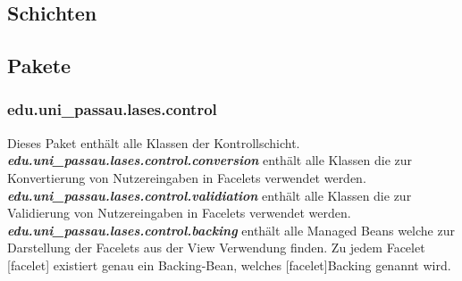 
\subsection{Schichten}\label{arch:schichten}

\subsection{Pakete}\label{arch:pakete}

\subsubsection{edu.uni\_passau.lases.control} \label{arch:control}
Dieses Paket enthält alle Klassen der Kontrollschicht.
\newline\newline
\textbf{\emph{edu.uni\_passau.lases.control.conversion}}
enthält alle Klassen die zur Konvertierung von Nutzereingaben
in Facelets verwendet werden.
\newline\newline
\textbf{\emph{edu.uni\_passau.lases.control.validiation}}
enthält alle Klassen die zur Validierung von Nutzereingaben
in Facelets verwendet werden.
\newline\newline
\textbf{\emph{edu.uni\_passau.lases.control.backing}}\label{arch:backing}
enthält alle Managed Beans welche zur Darstellung der Facelets aus der
View Verwendung finden. Zu jedem Facelet [facelet] existiert genau ein
Backing-Bean, welches [facelet]Backing genannt wird.

